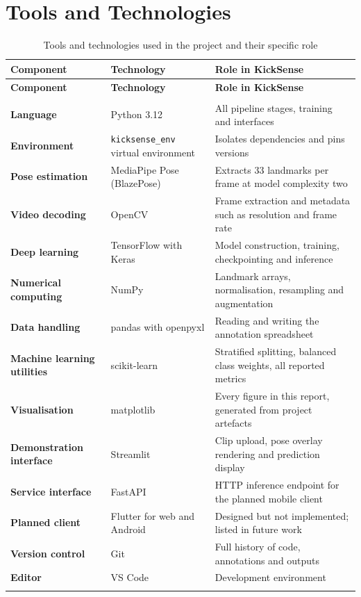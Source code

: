 \section{Tools and Technologies}

\renewcommand{\arraystretch}{1.25}
\small
\begin{longtable}{|>{\bfseries}p{3.4cm}|p{4.0cm}|p{5.6cm}|}
\hline
\textbf{Component} & \textbf{Technology} & \textbf{Role in KickSense} \\ \hline
\endfirsthead
\hline
\textbf{Component} & \textbf{Technology} & \textbf{Role in KickSense} \\ \hline
\endhead
\hline
\multicolumn{3}{r}{\textit{Continued on next page}} \\
\hline
\endfoot
\hline
\endlastfoot
Language & Python 3.12 & All pipeline stages, training and interfaces \\ \hline
Environment & \texttt{kicksense\_env} virtual environment & Isolates dependencies and pins versions \\ \hline
Pose estimation & MediaPipe Pose (BlazePose) & Extracts 33 landmarks per frame at model complexity two \\ \hline
Video decoding & OpenCV & Frame extraction and metadata such as resolution and frame rate \\ \hline
Deep learning & TensorFlow with Keras & Model construction, training, checkpointing and inference \\ \hline
Numerical computing & NumPy & Landmark arrays, normalisation, resampling and augmentation \\ \hline
Data handling & pandas with openpyxl & Reading and writing the annotation spreadsheet \\ \hline
Machine learning utilities & scikit-learn & Stratified splitting, balanced class weights, all reported metrics \\ \hline
Visualisation & matplotlib & Every figure in this report, generated from project artefacts \\ \hline
Demonstration interface & Streamlit & Clip upload, pose overlay rendering and prediction display \\ \hline
Service interface & FastAPI & HTTP inference endpoint for the planned mobile client \\ \hline
Planned client & Flutter for web and Android & Designed but not implemented; listed in future work \\ \hline
Version control & Git & Full history of code, annotations and outputs \\ \hline
Editor & VS Code & Development environment \\ \hline
\caption{Tools and technologies used in the project and their specific role}
\label{tab:tools}
\end{longtable}
\normalsize

